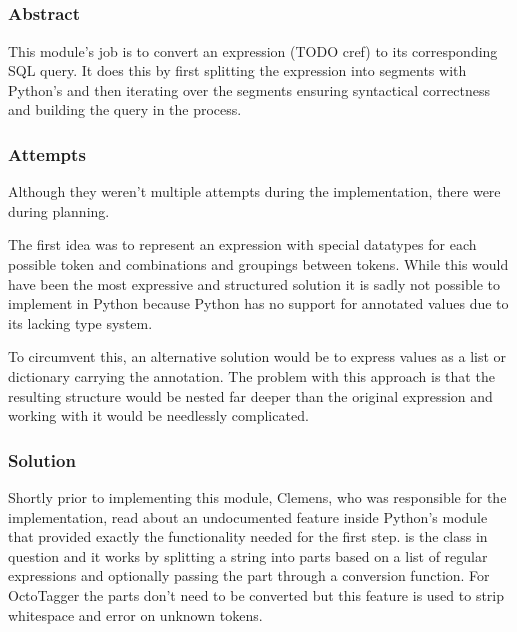 \subsection{}
\def\kapitelautor{Clemens Stadlbauer}

\subsubsection{Abstract}

This module's job is to convert an expression (TODO cref) to its corresponding
SQL query. It does this by first splitting the expression into segments with
Python's  and then iterating over the segments ensuring
syntactical correctness and building the query in the process.

\subsubsection{Attempts}

Although they weren't multiple attempts during the implementation, there were
during planning.

The first idea was to represent an expression with special datatypes for each
possible token and combinations and groupings between tokens. While this would
have been the most expressive and structured solution it is sadly not possible
to implement in Python because Python has no support for annotated values due
to its lacking type system.

To circumvent this, an alternative solution would be to express values as a
list or dictionary carrying the annotation. The problem with this approach is
that the resulting structure would be nested far deeper than the original
expression and working with it would be needlessly complicated.

\subsubsection{Solution} %

Shortly prior to implementing this module, Clemens, who was responsible for the
implementation, read about an undocumented feature inside Python's 
module that provided exactly the functionality needed for the first step.
 is the class in question and it works by splitting a string
into parts based on a list of regular expressions and optionally passing the
part through a conversion function. For OctoTagger the parts don't need to be
converted but this feature is used to strip whitespace and error on unknown
tokens.

